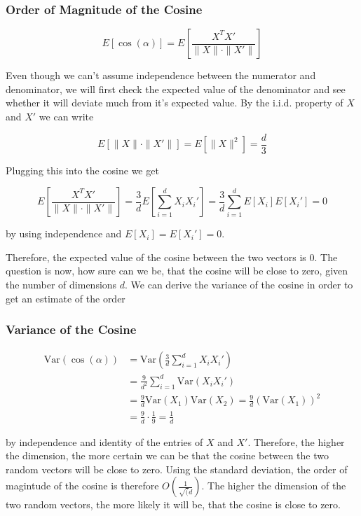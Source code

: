 \documentclass[a4paper, 11pt]{article} %
\begin{document}
\subsubsection{Order of Magnitude of the  Cosine}

\begin{equation*}
E \left[ \cos(\alpha) \right] = E \left[ \frac{X^TX'}{ \| X \| \cdot \| X' \|} \right]
\end{equation*}

Even though we can't assume independence between the numerator and denominator, we will first check the expected value of the denominator and see whether it will deviate much from it's expected value. By the i.i.d. property of $X$ and $X'$ we can write

\begin{equation*}
E[\| X \| \cdot \| X' \|] = E[ \|X \|^2] = \frac{d}{3}
\end{equation*}

Plugging this into the cosine we get 

\begin{equation*}
E \left[ \frac{X^TX'}{ \| X \| \cdot \| X' \|} \right] = \frac{3}{d} E \left[ \sum_{i=1}^d X_i X_i' \right] = \frac{3}{d}  \sum_{i=1}^d E[X_i] E[X_i'] = 0
\end{equation*}

by using independence and $E[X_i] = E[X_i'] = 0$. 

Therefore, the expected value of the cosine between the two vectors is 0. 
The question is now, how sure can we be, that the cosine will be close to zero, given the number of dimensions $d$. We can derive the variance of the cosine in order to get an estimate of the order

\subsubsection{Variance of the Cosine}

\begin{align*}
\text{Var}(\cos(\alpha)) &= \text{Var} \left( \frac{3}{d}  \sum_{i=1}^d X_i X_i' \right) \\
&= \frac{9}{d^2}  \sum_{i=1}^d \text{Var}(X_i X_i') \\
&=  \frac{9}{d}  \text{Var}(X_1) \text{Var}(X_2) = \frac{9}{d} (\text{Var}(X_1))^2  \\
&= \frac{9}{d} \cdot \frac{1}{9} = \frac{1}{d}
\end{align*}

by independence and identity of the entries of $X$ and $X'$. Therefore, the higher the dimension, the more certain we can be that the cosine between the two random vectors will be close to zero. Using the standard deviation, the order of magintude of the cosine is therefore $O(\frac{1}{\sqrt(d})$. The higher the dimension of the two random vectors, the more likely it will be, that the cosine is close to zero. 
\end{document}
